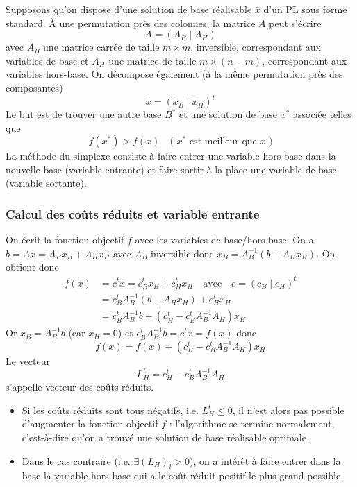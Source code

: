 \documentclass[a4paper,12pt,openany]{book}
\theoremstyle{plain}
\theoremstyle{definition}
\theoremstyle{remark}
\theoremstyle{nbstyle}
\begin{document}
	Supposons qu'on dispose d'une solution de base réalisable $\bar{x}$ d'un PL sous forme standard. À une permutation près des colonnes, la matrice $A$ peut s'écrire
	\[
	A = \left( A_{B} \mid A_{H} \right)
	\]
	avec $A_{B}$ une matrice carrée de taille $m \times m$, inversible, correspondant aux variables de base et $A_{H}$ une matrice de taille $m \times (n-m)$, correspondant aux variables hors-base. On décompose également (à la même permutation près des composantes)
	\[
	\bar{x} = \left( \bar{x}_{B} \mid \bar{x}_{H} \right)^{t}
	\]
	Le but est de trouver une autre base $B^{*}$ et une solution de base $x^{*}$ associée telles que
	\[
	f(x^{*}) > f(\bar{x}) \quad \text{( $x^{*}$ est meilleur que $\bar{x}$ )}
	\]
	La méthode du simplexe consiste à faire entrer une variable hors-base dans la nouvelle base (variable entrante) et faire sortir à la place une variable de base (variable sortante).
	
	\subsubsection{Calcul des coûts réduits et variable entrante}
	
	On écrit la fonction objectif $f$ avec les variables de base/hors-base. On a $b = A x = A_{B} x_{B} + A_{H} x_{H}$ avec $A_{B}$ inversible donc $x_{B} = A_{B}^{-1} (b - A_{H} x_{H})$. On obtient donc
	\[
	\begin{aligned}
	f(x) &= c^{t} x = c_{B}^{t} x_{B} + c_{H}^{t} x_{H} \quad \text{avec} \quad c = \left( c_{B} \mid c_{H} \right)^{t} \\
	&= c_{B}^{t} A_{B}^{-1} (b - A_{H} x_{H}) + c_{H}^{t} x_{H} \\
	&= c_{B}^{t} A_{B}^{-1} b + \left( c_{H}^{t} - c_{B}^{t} A_{B}^{-1} A_{H} \right) x_{H}
	\end{aligned}
	\]
	Or $x_{B} = A_{B}^{-1} b$ (car $x_{H} = 0$) et $c_{B}^{t} A_{B}^{-1} b = c^{t} x = f(x)$ donc
	\[
	f(x) = f(x) + \left( c_{H}^{t} - c_{B}^{t} A_{B}^{-1} A_{H} \right) x_{H}
	\]
	Le vecteur
	\[
	L_{H}^{t} = c_{H}^{t} - c_{B}^{t} A_{B}^{-1} A_{H}
	\]
	s'appelle vecteur des coûts réduits.
	
	\begin{itemize}
		\item Si les coûts réduits sont tous négatifs, i.e. $L_{H}^{t} \leq 0$, il n'est alors pas possible d'augmenter la fonction objectif $f$ : l'algorithme se termine normalement, c'est-à-dire qu'on a trouvé une solution de base réalisable optimale.
		\item Dans le cas contraire (i.e. $\exists (L_{H})_{i} > 0$), on a intérêt à faire entrer dans la base la variable hors-base qui a le coût réduit positif le plus grand possible.
	\end{itemize}
	
\end{document}
